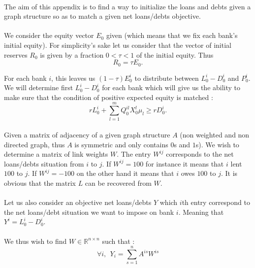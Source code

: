 \documentclass{article}
\begin{document}
\begin{appendices}
\paragraph{}
The aim of this appendix is to find a way to initialize the loans and debts given a graph structure so as to match a given net loans/debts objective. 

\paragraph{}
We consider the equity vector $E_0$ given (which means that we fix each bank's initial equity). For simplicity's sake let us consider that the vector of initial reserves $R_0$ is given by a fraction $0 < \tau < 1$ of the initial equity. Thus 
$$R_0 = \tau E_0.$$

For each bank $i$, this leaves us $(1-\tau)E^i_0$ to distribute between $L_0^i - D_0^i$ and $P_0^i$. We will determine first $L_0^i - D_0^i$ for each bank which will give us the ability to make sure that the condition of positive expected equity is matched :
$$rL_0^i + \sum_{l=1}^{m} Q_0^{il} X_0^l\mu_l \geq rD_0^i.$$

\paragraph{}
Given a matrix of adjacency of a given graph structure $A$ (non weighted and non directed graph, thus $A$ is symmetric and only contains $0$s and $1$s). We wish to determine a matrix of link weights $W$. The entry $W^{ij}$ corresponds to the net loans/debts situation from $i$ to $j$. If $W^{ij} = 100$ for instance it means that $i$ lent $100$ to $j$. If $W^{ij} = -100$ on the other hand it means that $i$ owes $100$ to $j$. It is obvious that the matrix $L$ can be recovered from $W$.

\paragraph{}
Let us also consider an objective net loans/debts $Y$ which $i$th entry correspond to the net loans/debt situation we want to impose on bank $i$. Meaning that $Y^i = L_0^i - D_0^i$.

\paragraph{}
We thus wish to find $W \in \mathbb{R}^{n \times n}$ such that : 
$$\forall i,~~ Y_i = \sum_{s=1}^n A^{is}W^{is}$$


\end{appendices}
\end{document}
